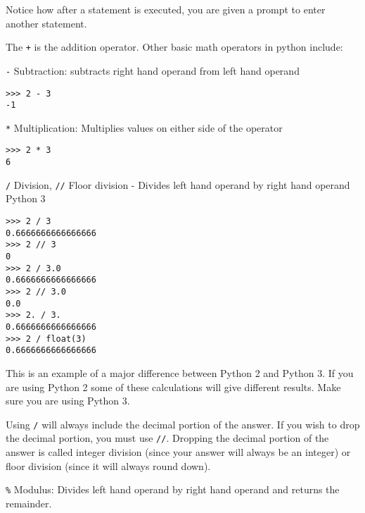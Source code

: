 \documentclass[12pt,hidelinks]{article}
\begin{document}
Notice how after a statement is executed, you are given a prompt to enter another statement.

The \texttt{+} is the addition operator. Other basic math operators in python include:

\texttt{-} Subtraction: subtracts right hand operand from left hand operand

\begin{lstlisting}[style=bash]
>>> 2 - 3
-1
\end{lstlisting}

\texttt{*} Multiplication: Multiplies values on either side of the operator

\begin{lstlisting}[style=bash]
>>> 2 * 3
6
\end{lstlisting}


\texttt{/} Division, \texttt{//} Floor division - Divides left hand operand by right hand operand
\\

Python 3
\begin{lstlisting}[style=bash]
>>> 2 / 3
0.6666666666666666
>>> 2 // 3
0
>>> 2 / 3.0
0.6666666666666666
>>> 2 // 3.0
0.0
>>> 2. / 3.
0.6666666666666666
>>> 2 / float(3)
0.6666666666666666
\end{lstlisting}

This is an example of a major difference between Python 2 and Python 3. If you are using Python 2 some of these calculations will give different results. Make sure you are using Python 3.

Using \texttt{/} will always include the decimal portion of the answer. If you wish to drop the decimal portion, you must use \texttt{//}. Dropping the decimal portion of the answer is called integer division (since your answer will always be an integer) or floor division (since it will always round down).



\texttt{\%} Modulus: Divides left hand operand by right hand operand and returns the remainder.
\end{document}
